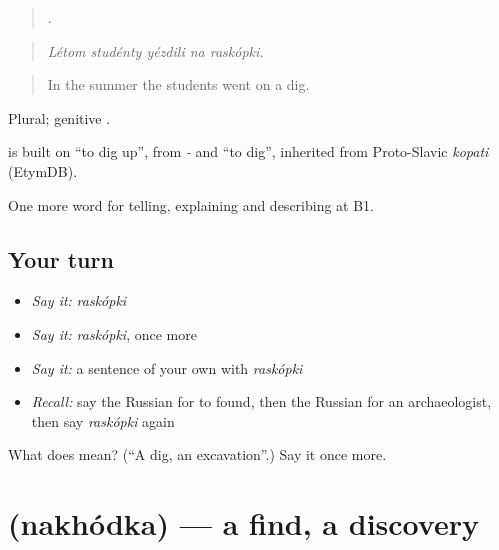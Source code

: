 \begin{quote}
    .
\end{quote}

\begin{quote}
\emph{Létom studénty yézdili na raskópki.}
\end{quote}

\begin{quote}
In the summer the students went on a dig.
\end{quote}

Plural; genitive \emph{}.

\begin{cousinweb}
\emph{} is built on \emph{} \textquotedblleft{}to dig up\textquotedblright{}, from \emph{-} and \emph{} \textquotedblleft{}to dig\textquotedblright{}, inherited from Proto-Slavic \emph{kopati} (EtymDB).
\end{cousinweb}

\begin{grammarlens}[title={What you've built}]
One more word for telling, explaining and describing at B1.
\end{grammarlens}

\subsection*{Your turn}
\begin{itemize}
\raggedright
  \item \emph{Say it:} \emph{raskópki}
  \item \emph{Say it:} \emph{raskópki}, once more
  \item \emph{Say it:} a sentence of your own with \emph{raskópki}
  \item \emph{Recall:} say the Russian for to found, then the Russian for an archaeologist, then say \emph{raskópki} again
\end{itemize}

\begin{tcolorbox}[breakable,colback=teal!4,colframe=teal!35!black,title={Before you move on}]
What does  mean? (\textquotedblleft{}A dig, an excavation\textquotedblright{}.) Say it once more.
\end{tcolorbox}
\section[\texorpdfstring{\ru{находка} (nakhódka)}{находка (nakhódka)}]{ (nakhódka) — a find, a discovery}

